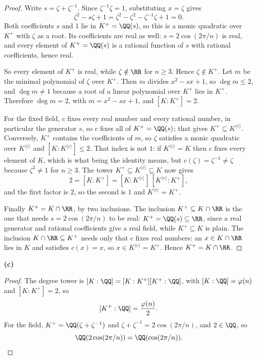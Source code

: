 \documentclass[11pt]{article}
\begin{document}
\begin{proof}
Write $s=\zeta+\zeta^{-1}$. Since $\zeta^{-1}\zeta=1$, substituting $x=\zeta$ gives
\[
\zeta^{2}-s\zeta+1=\zeta^{2}-\zeta^{2}-\zeta^{-1}\zeta+1=0.
\]
Both coefficients $s$ and $1$ lie in $K^{+}=\QQ(s)$, so this is a monic quadratic over $K^{+}$ with $\zeta$ as a root. Its coefficients are real as well: $s=2\cos(2\pi/n)$ is real, and every element of $K^{+}=\QQ(s)$ is a rational function of $s$ with rational coefficients, hence real.

So every element of $K^{+}$ is real, while $\zeta\notin\RR$ for $n\ge3$. Hence $\zeta\notin K^{+}$. Let $m$ be the minimal polynomial of $\zeta$ over $K^{+}$. Then $m$ divides $x^{2}-sx+1$, so $\deg m\le2$, and $\deg m\ne1$ because a root of a linear polynomial over $K^{+}$ lies in $K^{+}$. Therefore $\deg m=2$, with $m=x^{2}-sx+1$, and $[K:K^{+}]=2$.

For the fixed field, $c$ fixes every real number and every rational number, in particular the generator $s$, so $c$ fixes all of $K^{+}=\QQ(s)$; that gives $K^{+}\subseteq K^{\langle c\rangle}$. Conversely, $K^{+}$ contains the coefficients of $m$, so $\zeta$ satisfies a monic quadratic over $K^{\langle c\rangle}$ and $[K:K^{\langle c\rangle}]\le2$. That index is not $1$: if $K^{\langle c\rangle}=K$ then $c$ fixes every element of $K$, which is what being the identity means, but $c(\zeta)=\zeta^{-1}\ne\zeta$ because $\zeta^{2}\ne1$ for $n\ge3$. The tower $K^{+}\subseteq K^{\langle c\rangle}\subseteq K$ now gives
\[
2=[K:K^{+}]=[K:K^{\langle c\rangle}]\,[K^{\langle c\rangle}:K^{+}],
\]
and the first factor is $2$, so the second is $1$ and $K^{\langle c\rangle}=K^{+}$.

Finally $K^{+}=K\cap\RR$, by two inclusions. The inclusion $K^{+}\subseteq K\cap\RR$ is the one that needs $s=2\cos(2\pi/n)$ to be real: $K^{+}=\QQ(s)\subseteq\RR$, since a real generator and rational coefficients give a real field, while $K^{+}\subseteq K$ is plain. The inclusion $K\cap\RR\subseteq K^{+}$ needs only that $c$ fixes real numbers: an $x\in K\cap\RR$ lies in $K$ and satisfies $c(x)=x$, so $x\in K^{\langle c\rangle}=K^{+}$. Hence $K^{+}=K\cap\RR$.
\end{proof}
\noindent\textbf{(c)}
\begin{proof}
The degree tower is $[K:\QQ]=[K:K^{+}][K^{+}:\QQ]$, with $[K:\QQ]=\varphi(n)$ and $[K:K^{+}]=2$, so
\[
[K^{+}:\QQ]=\frac{\varphi(n)}{2}.
\]
For the field, $K^{+}=\QQ(\zeta+\zeta^{-1})$ and $\zeta+\zeta^{-1}=2\cos(2\pi/n)$, and $2\in\QQ$, so
\[
\QQ(2\cos(2\pi/n))=\QQ(\cos(2\pi/n)).
\]
\end{proof}
\end{document}
